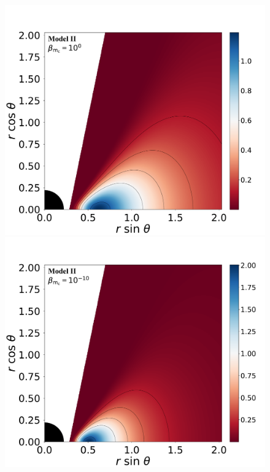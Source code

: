 \documentclass[twocolumn,aps,showpacs,showkeys,prd,superscriptaddress,byrevtex, amsmath]{revtex4-1}
\begin{document}
\begin{figure}
\includegraphics[scale=0.14]{figures/fig1_II_1.pdf}
\hspace{-0.2cm}
\includegraphics[scale=0.14]{figures/fig1_II__10.pdf}
\\

\end{figure}
\end{document}
